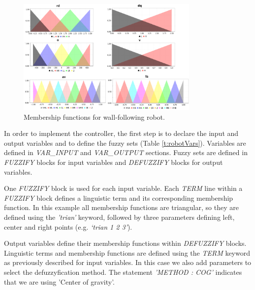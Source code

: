 \documentclass[conference]{IEEEtran}
\begin{document}
\begin{figure}[!t]
\centering
\includegraphics[width=3.5in]{figs/robot_vars_2.png}
\caption{Membership functions for wall-following robot.}
\label{f:robotVars}
\end{figure}

In order to implement the controller, the first step is to declare the input and output variables and to define the fuzzy sets (Table \ref{t:robotVars}).
Variables are defined in \textit{VAR\_INPUT} and \textit{VAR\_OUTPUT} sections.
Fuzzy sets are defined in \textit{FUZZIFY} blocks for input variables and \textit{DEFUZZIFY} blocks for output variables.

One \textit{FUZZIFY} block is used for each input variable.
Each \textit{TERM} line within a \textit{FUZZIFY} block defines a linguistic term and its corresponding membership function. 
In this example all membership functions are triangular, so they are defined using the \textit{'trian'} keyword, followed by three parameters defining left, center and right points (e.g. \textit{`trian 1 2 3'}).

Output variables define their membership functions within \textit{DEFUZZIFY} blocks.
Linguistic terms and membership functions are defined using the \textit{TERM} keyword as previously described for input variables.
In this case we also add parameters to select the defuzzyfication method. 
The statement \textit{'METHOD : COG'} indicates that we are using 'Center of gravity'.
\end{document}
